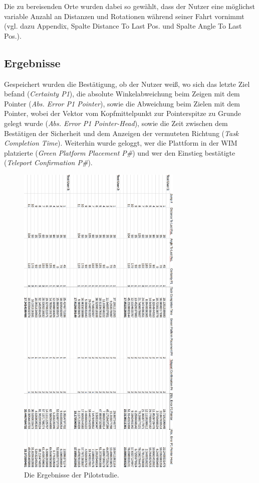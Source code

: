 Die zu bereisenden Orte wurden dabei so gewählt, dass der Nutzer eine möglichst variable Anzahl an Distanzen und Rotationen während seiner Fahrt vornimmt (vgl. dazu Appendix, Spalte \glqq Distance To Last Pos.\grqq{} und Spalte \glqq Angle To Last Pos.\grqq{}).


\subsection{Ergebnisse}

Gespeichert wurden die Bestätigung, ob der Nutzer weiß, wo sich das letzte Ziel befand (\textit{Certainty P1}), die absolute Winkelabweichung beim Zeigen mit dem Pointer (\textit{Abs. Error P1 Pointer}), sowie die Abweichung beim Zielen mit dem Pointer, wobei der Vektor vom Kopfmittelpunkt zur Pointerspitze zu Grunde gelegt wurde (\textit{Abs. Error P1 Pointer-Head}), sowie die Zeit zwischen dem Bestätigen der Sicherheit und dem Anzeigen der vermuteten Richtung (\textit{Task Completion Time}). Weiterhin wurde geloggt, wer die Plattform in der WIM platzierte (\textit{Green Platform Placement P\#}) und wer den Einstieg bestätigte (\textit{Teleport Confirmation P\#}).

\begin{figure}[h!]
  \centering
  \includegraphics[width=0.7\textwidth]{images/ergebnisse.png}
  \caption{Die Ergebnisse der Pilotstudie.}
  \label{fig:todo}
\end{figure}


